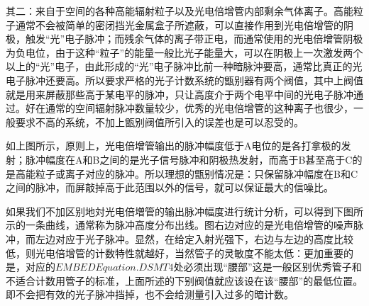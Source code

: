 \documentclass[UTF8]{ctexart}
\begin{document}
其二：来自于空间的各种高能辐射粒子以及光电倍增管内部剩余气体离子。高能粒子通常不会被简单的密闭挡光金属盒子所遮蔽，可以直接作用到光电倍增管的阴极，触发“光”电子脉冲；而残余气体的离子带正电，而通常使用的光电倍增管阴极为负电位，由于这种“粒子”的能量一般比光子能量大，可以在阴极上一次激发两个以上的“光”电子，由此形成的“光”电子脉冲比前一种暗脉沖要高，通常比真正的光电子脉冲还要高。所以要求严格的光子计数系统的甑别器有两个阀值，其中上阀值就是用来屏蔽那些高于某电平的脉冲，只让高度介于两个电平中间的光电子脉冲通过。好在通常的空间辐射脉冲数量较少，优秀的光电倍增管的这种离子也很少，一般要求不高的系统，不加上甑别阀值所引入的误差也是可以忍受的。

如上图所示，原则上，光电倍增管输出的脉冲幅度低于A电位的是各打拿极的发射；脉冲幅度在A和B之间的是光子信号脉冲和阴极热发射，而高于B甚至高于C的是高能粒子或离子对应的脉冲。所以理想的甑别情况是：只保留脉冲幅度在B和C之间的脉冲，而屏敲掉高于此范围以外的信号，就可以保证最大的信噪比。

如果我们不加区别地対光电倍増管的输出脉冲幅度进行统计分析，可以得到下图所示的一条曲线，通常称为脉冲高度分布出线。图右边对应的是光电倍增管的噪声脉冲，而左边对应于光子脉冲。显然，在给定入射光强下，右边与左边的高度比较低，则光电倍增管的计数特性就越好，当然管子的灵敏度不能太低：更加重要的是，对应的${EMBED Equation.DSMT4}$处必须出现“腰部”这是一般区别优秀管子和不适合计数用管子的标准，上面所述的下别阀值就应该设在该“腰部”的最低位置。即不会把有效的光子脉冲挡掉，也不会给测量引入过多的暗计数。
\end{document}
